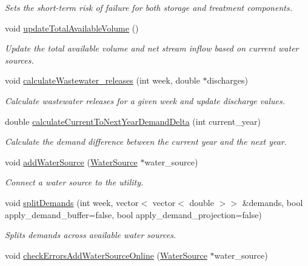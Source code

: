 \begin{DoxyCompactItemize}
\begin{DoxyCompactList}\small\item\em Sets the short-\/term risk of failure for both storage and treatment components. \end{DoxyCompactList}\item 
void \mbox{\hyperlink{classUtility_af394fe9f04a371a7cf10ddadba575e85}{update\+Total\+Available\+Volume}} ()
\begin{DoxyCompactList}\small\item\em Update the total available volume and net stream inflow based on current water sources. \end{DoxyCompactList}\item 
void \mbox{\hyperlink{classUtility_a5feecc73d561de022eb6ba3c657b3dbc}{calculate\+Wastewater\+\_\+releases}} (int week, double $\ast$discharges)
\begin{DoxyCompactList}\small\item\em Calculate wastewater releases for a given week and update discharge values. \end{DoxyCompactList}\item 
double \mbox{\hyperlink{classUtility_a38381b003d13986e37757dfea683f7f9}{calculate\+Current\+To\+Next\+Year\+Demand\+Delta}} (int current\+\_\+year)
\begin{DoxyCompactList}\small\item\em Calculate the demand difference between the current year and the next year. \end{DoxyCompactList}\item 
void \mbox{\hyperlink{classUtility_aebbfd65c13e86cfeda8bdfbcc6712587}{add\+Water\+Source}} (\mbox{\hyperlink{classWaterSource}{Water\+Source}} $\ast$water\+\_\+source)
\begin{DoxyCompactList}\small\item\em Connect a water source to the utility. \end{DoxyCompactList}\item 
void \mbox{\hyperlink{classUtility_aca42b14087c3184d4fec10a2e8729c05}{split\+Demands}} (int week, vector$<$ vector$<$ double $>$$>$ \&demands, bool apply\+\_\+demand\+\_\+buffer=false, bool apply\+\_\+demand\+\_\+projection=false)
\begin{DoxyCompactList}\small\item\em Splits demands across available water sources. \end{DoxyCompactList}\item 
void \mbox{\hyperlink{classUtility_a0674d7d95f4d6595f7e01817a4d84a98}{check\+Errors\+Add\+Water\+Source\+Online}} (\mbox{\hyperlink{classWaterSource}{Water\+Source}} $\ast$water\+\_\+source)
$$
\end{DoxyCompactItemize}
